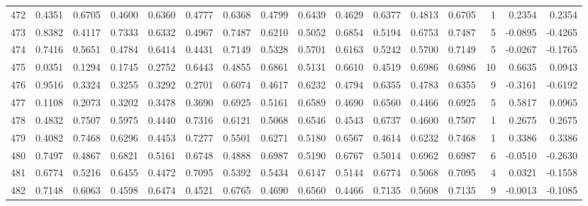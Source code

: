\begin{tabular}{lrrrrrrrrrrrrrrr}
472 &      0.4351 &  0.6705 &  0.4600 &  0.6360 &  0.4777 &  0.6368 &  0.4799 &  0.6439 &  0.4629 &  0.6377 &   0.4813 &     0.6705 &      1 &                    0.2354 &                     0.2354 \\
473 &      0.8382 &  0.4117 &  0.7333 &  0.6332 &  0.4967 &  0.7487 &  0.6210 &  0.5052 &  0.6854 &  0.5194 &   0.6753 &     0.7487 &      5 &                   -0.0895 &                    -0.4265 \\
474 &      0.7416 &  0.5651 &  0.4784 &  0.6414 &  0.4431 &  0.7149 &  0.5328 &  0.5701 &  0.6163 &  0.5242 &   0.5700 &     0.7149 &      5 &                   -0.0267 &                    -0.1765 \\
475 &      0.0351 &  0.1294 &  0.1745 &  0.2752 &  0.6443 &  0.4855 &  0.6861 &  0.5131 &  0.6610 &  0.4519 &   0.6986 &     0.6986 &     10 &                    0.6635 &                     0.0943 \\
476 &      0.9516 &  0.3324 &  0.3255 &  0.3292 &  0.2701 &  0.6074 &  0.4617 &  0.6232 &  0.4794 &  0.6355 &   0.4783 &     0.6355 &      9 &                   -0.3161 &                    -0.6192 \\
477 &      0.1108 &  0.2073 &  0.3202 &  0.3478 &  0.3690 &  0.6925 &  0.5161 &  0.6589 &  0.4690 &  0.6560 &   0.4466 &     0.6925 &      5 &                    0.5817 &                     0.0965 \\
478 &      0.4832 &  0.7507 &  0.5975 &  0.4440 &  0.7316 &  0.6121 &  0.5068 &  0.6546 &  0.4543 &  0.6737 &   0.4600 &     0.7507 &      1 &                    0.2675 &                     0.2675 \\
479 &      0.4082 &  0.7468 &  0.6296 &  0.4453 &  0.7277 &  0.5501 &  0.6271 &  0.5180 &  0.6567 &  0.4614 &   0.6232 &     0.7468 &      1 &                    0.3386 &                     0.3386 \\
480 &      0.7497 &  0.4867 &  0.6821 &  0.5161 &  0.6748 &  0.4888 &  0.6987 &  0.5190 &  0.6767 &  0.5014 &   0.6962 &     0.6987 &      6 &                   -0.0510 &                    -0.2630 \\
481 &      0.6774 &  0.5216 &  0.6455 &  0.4472 &  0.7095 &  0.5392 &  0.5434 &  0.6147 &  0.5144 &  0.6774 &   0.5068 &     0.7095 &      4 &                    0.0321 &                    -0.1558 \\
482 &      0.7148 &  0.6063 &  0.4598 &  0.6474 &  0.4521 &  0.6765 &  0.4690 &  0.6560 &  0.4466 &  0.7135 &   0.5608 &     0.7135 &      9 &                   -0.0013 &                    -0.1085 \\

\end{tabular}
